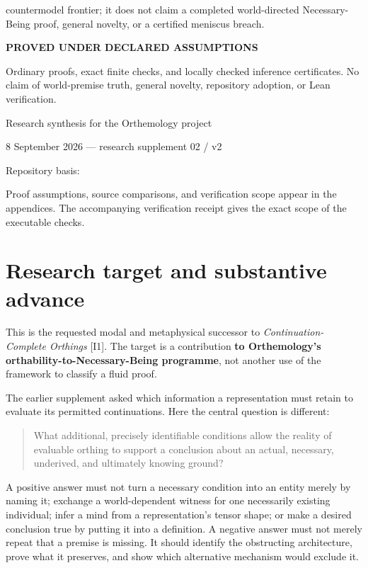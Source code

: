 \documentclass[11pt,a4paper]{article}
\begin{document}
\begin{titlepage}
countermodel frontier; it does not claim a completed world-directed
Necessary-Being proof, general novelty, or a certified meniscus breach.
\vfill
{\sffamily\small\bfseries\color{ink} PROVED UNDER DECLARED ASSUMPTIONS\par}
{\small Ordinary proofs, exact finite checks, and locally checked inference certificates. No claim of world-premise truth, general novelty, repository adoption, or Lean verification.\par}
\vspace{6mm}
{\sffamily\small Research synthesis for the Orthemology project\par}
{\sffamily\small\color{softink} 8 September 2026 --- research supplement
02 / v2\par}
\vspace{4mm}
{\footnotesize Repository basis: \par}
\end{titlepage}
\begingroup
\setlength{\parskip}{0pt}
\tableofcontents
\endgroup
\vspace{6mm}
{\small\color{softink} Proof assumptions, source comparisons, and verification scope appear in the appendices. The accompanying verification receipt gives the exact scope of the executable checks.}
\clearpage
{}
\section{Research target and substantive
advance}\label{research-target-and-substantive-advance}

This is the requested modal and metaphysical successor to
\emph{Continuation-Complete Orthings} {[}I1{]}. The target is a
contribution \textbf{to Orthemology's orthability-to-Necessary-Being
programme}, not another use of the framework to classify a fluid proof.

The earlier supplement asked which information a representation must
retain to evaluate its permitted continuations. Here the central
question is different:

\begin{quote}
What additional, precisely identifiable conditions allow the reality of
evaluable orthing to support a conclusion about an actual, necessary,
underived, and ultimately knowing ground?
\end{quote}

A positive answer must not turn a necessary condition into an entity
merely by naming it; exchange a world-dependent witness for one
necessarily existing individual; infer a mind from a representation's
tensor shape; or make a desired conclusion true by putting it into a
definition. A negative answer must not merely repeat that a premise is
missing. It should identify the obstructing architecture, prove what it
preserves, and show which alternative mechanism would exclude it.
\end{document}
